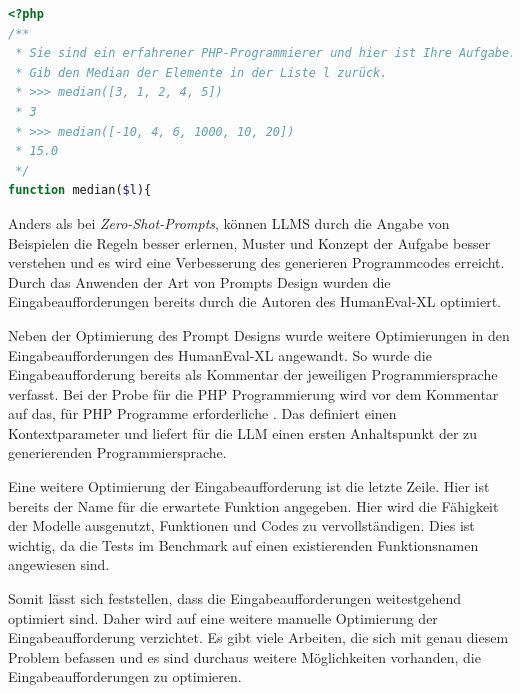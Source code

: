 \begin{lstlisting}[language=php,caption={Prompt Beispiel für  eine Aufgabe aus dem HumanEval-XL Benchmark},label=lst:example_prompt_by_humaneval_benchmark]
<?php
/**
 * Sie sind ein erfahrener PHP-Programmierer und hier ist Ihre Aufgabe.
 * Gib den Median der Elemente in der Liste l zurück.
 * >>> median([3, 1, 2, 4, 5])
 * 3
 * >>> median([-10, 4, 6, 1000, 10, 20])
 * 15.0
 */
function median($l){
\end{lstlisting}

Anders als bei \textit{Zero-Shot-Prompts}, können LLMS durch die Angabe von Beispielen die Regeln besser erlernen, Muster und Konzept der Aufgabe besser verstehen und es wird eine Verbesserung des generieren Programmcodes erreicht. Durch das Anwenden der Art von Prompts Design wurden die Eingabeaufforderungen bereits durch die Autoren des HumanEval-XL optimiert.\vspace{0.2cm}

Neben der Optimierung des Prompt Designs wurde weitere Optimierungen in den Eingabeaufforderungen des HumanEval-XL angewandt. So wurde die Eingabeaufforderung bereits als Kommentar der jeweiligen Programmiersprache verfasst. Bei der Probe für die PHP Programmierung wird vor dem Kommentar auf das, für PHP Programme erforderliche . Das definiert einen Kontextparameter und liefert für die LLM einen ersten Anhaltspunkt der zu generierenden Programmiersprache.\vspace{0.2cm}

Eine weitere Optimierung der Eingabeaufforderung ist die letzte Zeile. Hier ist bereits der Name für die erwartete Funktion angegeben. Hier wird die Fähigkeit der Modelle ausgenutzt, Funktionen und Codes zu vervollständigen. Dies ist wichtig, da die Tests im Benchmark auf einen existierenden Funktionsnamen angewiesen sind.\vspace{0.2cm}

Somit lässt sich feststellen, dass die Eingabeaufforderungen weitestgehend optimiert sind. Daher wird auf eine weitere manuelle Optimierung der Eingabeaufforderung verzichtet. Es gibt viele Arbeiten, die sich mit genau diesem Problem befassen und es sind durchaus weitere Möglichkeiten vorhanden, die Eingabeaufforderungen zu optimieren.\vspace{0.2cm}




